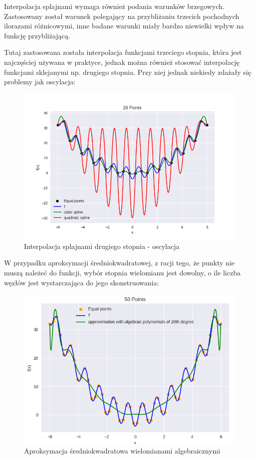 \documentclass{article}
\begin{document}
Interpolacja splajnami wymaga również podania warunków brzegowych. Zastosowany został warunek polegający na przybliżaniu trzecich
pochodnych ilorazami różnicowymi, inne badane warunki miały bardzo niewielki wpływ na funkcję przybliżającą.

Tutaj zastosowana została interpolacja funkcjami trzeciego stopnia, która jest najczęściej używana w praktyce, 
jednak można również stosować interpolację funkcjami sklejanymi np. drugiego
stopnia. Przy niej jednak niekiedy zdażały się problemy jak oscylacja:

\begin{figure}[H]
    \centering
    \includegraphics[width=\textwidth]{img/spline_26.png}
    \caption{Interpolacja splajnami drugiego stopnia - oscylacja}
\end{figure}

W przypadku aproksymacji średniokwadratowej, z racji tego, że punkty nie muszą należeć do funkcji, wybór stopnia wielomianu
jest dowolny, o ile liczba węzłów jest wystarczająca do jego skonstruowania:

\begin{figure}[H]
    \centering
    \includegraphics[width=\textwidth]{img/algpoly_20_50.png}
    \caption{Aproksymacja średniokwadratowa wielomianami algebraicznymi}
\end{figure}
\end{document}
